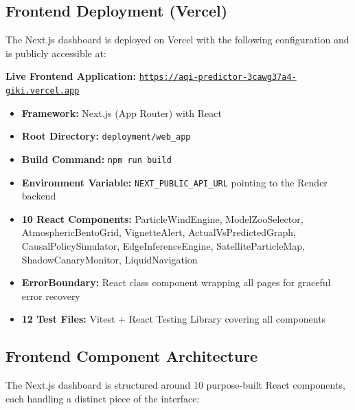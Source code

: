 \documentclass[12pt, a4paper, oneside]{article}
\begin{document}
\subsection{Frontend Deployment (Vercel)}

The Next.js dashboard is deployed on Vercel with the following configuration and is publicly accessible at:

\vspace{0.2cm}
\begin{center}
\textbf{Live Frontend Application:} \href{https://aqi-predictor-3cawg37a4-giki.vercel.app}{\texttt{https://aqi-predictor-3cawg37a4-giki.vercel.app}}
\end{center}
\vspace{0.2cm}

\begin{itemize}
    \item \textbf{Framework:} Next.js (App Router) with React
    \item \textbf{Root Directory:} \texttt{deployment/web\_app}
    \item \textbf{Build Command:} \texttt{npm run build}
    \item \textbf{Environment Variable:} \texttt{NEXT\_PUBLIC\_API\_URL} pointing to the Render backend
    \item \textbf{10 React Components:} ParticleWindEngine, ModelZooSelector, AtmosphericBentoGrid, VignetteAlert, ActualVsPredictedGraph, CausalPolicySimulator, EdgeInferenceEngine, SatelliteParticleMap, ShadowCanaryMonitor, LiquidNavigation
    \item \textbf{ErrorBoundary:} React class component wrapping all pages for graceful error recovery
    \item \textbf{12 Test Files:} Vitest + React Testing Library covering all components
\end{itemize}

\subsection{Frontend Component Architecture}

The Next.js dashboard is structured around 10 purpose-built React components, each handling a distinct piece of the interface:
\end{document}
